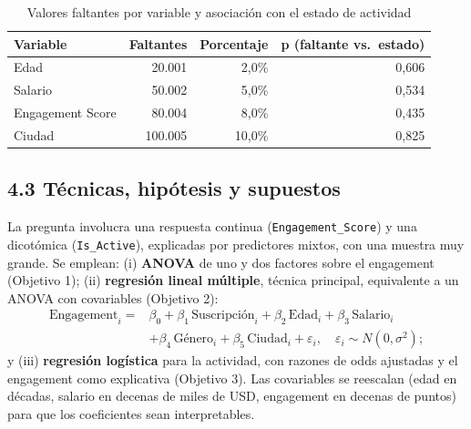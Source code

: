\documentclass[a4,11pt]{aleph-notas}
\begin{document}
\begin{table}[!htb]\centering\small\linespread{1}\selectfont
\caption{Valores faltantes por variable y asociación con el estado de actividad}\label{tab:faltantes}
\begin{tabular}{lrrr}
\toprule
Variable & Faltantes & Porcentaje & p (faltante vs. estado) \\
\midrule
Edad & 20.001 & 2,0\% & 0,606 \\
Salario & 50.002 & 5,0\% & 0,534 \\
Engagement Score & 80.004 & 8,0\% & 0,435 \\
Ciudad & 100.005 & 10,0\% & 0,825 \\
\bottomrule
\end{tabular}
\par{}
\end{table}


\subsection*{4.3 Técnicas, hipótesis y supuestos}
La pregunta involucra una respuesta continua (\texttt{Engagement\_Score}) y una dicotómica (\texttt{Is\_Active}), explicadas por predictores mixtos, con una muestra muy grande. Se emplean: (i) \textbf{ANOVA} de uno y dos factores sobre el engagement (Objetivo 1); (ii) \textbf{regresión lineal múltiple}, técnica principal, equivalente a un ANOVA con covariables (Objetivo 2):
\[
\begin{split}
\text{Engagement}_i={}&\beta_0+\beta_1\,\text{Suscripción}_i+\beta_2\,\text{Edad}_i+\beta_3\,\text{Salario}_i\\
&+\beta_4\,\text{Género}_i+\beta_5\,\text{Ciudad}_i+\varepsilon_i,\quad \varepsilon_i\sim N(0,\sigma^2);
\end{split}
\]
y (iii) \textbf{regresión logística} para la actividad, con razones de odds ajustadas y el engagement como explicativa (Objetivo 3). Las covariables se reescalan (edad en décadas, salario en decenas de miles de USD, engagement en decenas de puntos) para que los coeficientes sean interpretables.
\end{document}
